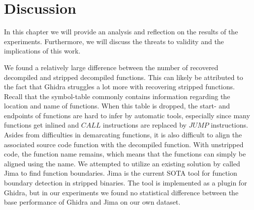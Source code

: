 \chapter{Discussion}
\label{discussion}
{}
In this chapter we will provide an analysis and reflection on the results of the experiments. Furthermore, we will discuss the threats to validity and the implications of this work.

We found a relatively large difference between the number of recovered decompiled and stripped decompiled functions. This can likely be attributed to the fact that Ghidra struggles a lot more with recovering stripped functions. Recall that the symbol-table commonly contains information regarding the location and name of functions. When this table is dropped, the start- and endpoints of functions are hard to infer by automatic tools, especially since many functions get inlined and \(CALL\) instructions are replaced by \(JUMP\) instructions. Asides from difficulties in demarcating functions, it is also difficult to align the associated source code function with the decompiled function. With unstripped code, the function name remains, which means that the functions can simply be aligned using the name. We attempted to utilize an existing solution by \citeauthor{FunctionBoundaryDetection} called Jima \cite{FunctionBoundaryDetection} to find function boundaries. Jima is the current SOTA tool for function boundary detection in stripped binaries. The tool is implemented as a plugin for Ghidra, but in our experiments we found no statistical difference between the base performance of Ghidra and Jima on our own dataset.

